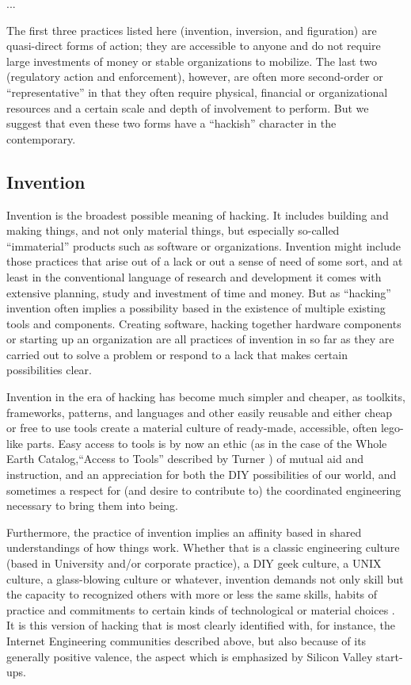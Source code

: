 \documentclass[10pt,letter,oneside]{scrartcl}
\begin{document}
...

The first three practices listed here (invention, inversion, and figuration) are
quasi-direct forms of action; they are accessible to anyone and do not require
large investments of money or stable organizations to mobilize.  The last two
(regulatory action and enforcement), however, are often more second-order or
``representative'' in that they often require physical, financial or
organizational resources and a certain scale and depth of involvement to
perform.  But we suggest that even these two forms have a ``hackish'' character
in the contemporary.


\subsection*{Invention}

Invention is the broadest possible meaning of hacking. It includes building and
making things, and not only material things, but especially so-called
``immaterial'' products such as software or organizations.  Invention might
include those practices that arise out of a lack or out a sense of need of some
sort, and at least in the conventional language of research and development it
comes with extensive planning, study and investment of time and money.  But as
``hacking'' invention often implies a possibility based in the existence of
multiple existing tools and components.  Creating software, hacking together
hardware components or starting up an organization are all practices of
invention in so far as they are carried out to solve a problem or respond to a
lack that makes certain possibilities clear.

Invention in the era of hacking has become much simpler and cheaper, as
toolkits, frameworks, patterns, and languages and other easily reusable and either
cheap or free to use tools create a material culture of ready-made, accessible,
often lego-like parts.  Easy access to tools is by now an ethic (as in the case
of the Whole Earth Catalog,``Access to Tools'' described by Turner
\cite*{turner_counterculture_2006}) of mutual aid and instruction, and an
appreciation for both the DIY possibilities of our world, and sometimes a
respect for (and desire to contribute to) the coordinated engineering necessary
to bring them into being.

Furthermore, the practice of invention implies an affinity based in shared
understandings of how things work.  Whether that is a classic engineering
culture (based in University and/or corporate practice), a DIY geek culture, a
UNIX culture, a glass-blowing culture \parencite{o2005embodied} or whatever,
invention demands not only skill but the capacity to recognized others with more
or less the same skills, habits of practice and commitments to certain kinds of
technological or material choices \parencite{Sennett2008}.  It is this version 
of hacking that is most clearly identified with, for instance, the Internet Engineering
communities described above, but also because of its generally positive valence,
the aspect which is emphasized by Silicon Valley start-ups.
\end{document}
